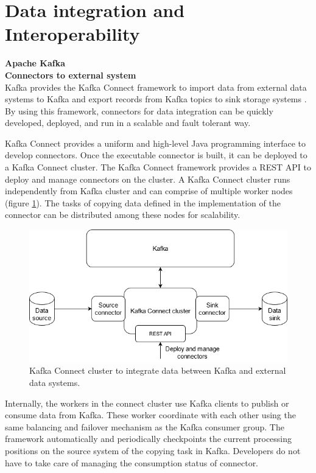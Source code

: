 \section{Data integration and Interoperability}
\large \textbf{Apache Kafka}\\
\normalsize
\textbf{Connectors to external system}\\
Kafka provides the Kafka Connect framework to import data from external data systems to Kafka and export records from Kafka topics to sink storage systems \cite{kafkaconnect}. By using this framework, connectors for data integration can be quickly developed, deployed, and run in a scalable and fault tolerant way. 

Kafka Connect provides a uniform and high-level Java programming interface to develop connectors. Once the executable connector is built, it can be deployed to a Kafka Connect cluster. The Kafka Connect framework provides a REST API to deploy and manage connectors on the cluster. A Kafka Connect cluster runs independently from Kafka cluster and can comprise of multiple worker nodes (figure \ref{fig:connectkafka}). The tasks of copying data defined in the implementation of the connector can be distributed among these nodes for scalability. 

\begin{figure}[h]
	\centering
	\includegraphics[width=12cm]{images/connector-kafka.png}
	\caption{Kafka Connect cluster to integrate data between Kafka and external data systems.}
	\label{fig:connectkafka}
\end{figure}

Internally, the workers in the connect cluster use Kafka clients to publish or consume data from Kafka. These worker coordinate with each other using the same balancing and failover mechanism as the Kafka consumer group. The framework automatically and periodically checkpoints the current processing positions on the source system of the copying task in Kafka. Developers do not have to take care of managing the consumption status of connector.

